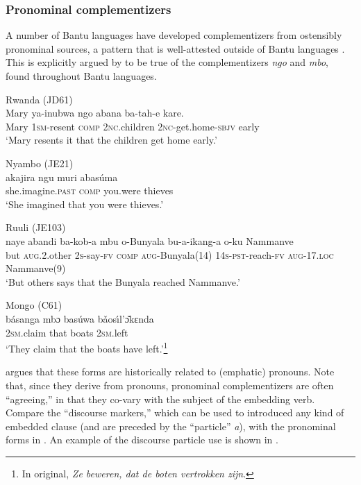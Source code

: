 \documentclass[output=paper,colorlinks,citecolor=brown,
]{langscibook}
\begin{document}
\subsubsection{Pronominal complementizers}\label{sec:gluckman:procompsection}


 A number of Bantu languages have developed complementizers from ostensibly pronominal sources, a pattern that is well-attested outside of Bantu languages  \citep{DiesselBreunesse:2020}. This is explicitly argued by \citet{Botne:1995} to be true of the complementizers \textit{ngo} and \textit{mbo}, found throughout Bantu languages. 

	\ea
		\begin{xlist}
		\ex Rwanda (JD61) \citep[38]{Rugege:1984} \\
		\gll Mary ya-inubwa ngo abana ba-tah-e kare.\\
		Mary 1\textsc{sm}-resent \textsc{comp} 2\textsc{nc}.children 2\textsc{nc}-get.home-\textsc{sbjv} early\\
		\glt `Mary resents it that the children get home early.' 

	\ex Nyambo (JE21) \citep[96]{Rugemalira:2005} \\
	\gll akajira ngu muri abas\'uma\\
	she.imagine.\textsc{past} \textsc{comp} you.were thieves\\
	\glt `She imagined that you were thieves.' 
	
	\ex Ruuli (JE103) \citep[94]{Sorensonetal:2020} \\
	\gll naye abandi ba-kob-a mbu o-Bunyala bu-a-ikang-a o-ku Nammanve\\
	but \textsc{aug}.2.other 2\textsc{s}-say-\textsc{fv} \textsc{comp} \textsc{aug}-Bunyala(14) 14\textsc{s}-\textsc{pst}-reach-\textsc{fv} \textsc{aug}-17.\textsc{loc} Nammanve(9)\\
	\glt `But others says that the Bunyala reached Nammanve.' 


	\ex Mongo (C61) \citep[126]{Rop:1958} \\
	\gll básanga mbɔ bas\'uwa b\v{a}os\'\i l'\v{ɔ}kɛnda\\
	2\textsc{sm}.claim that boats 2\textsc{sm.}left\\
	\glt `They claim that the boats have left.'\footnote{In original, \textit{Ze beweren, dat de boten vertrokken zijn}.} 
		\end{xlist}
	\z


\citet{Botne:1995} argues that these forms are historically related to (emphatic) pronouns. Note that, since they derive from pronouns, pronominal complementizers are often ``agreeing,'' in that they co-vary with the subject of the embedding verb. Compare the ``discourse markers,'' which can be used to introduced any kind of embedded clause (and are preceded by the ``particle'' \textit{a}), with the pronominal forms in . An example of the discourse particle use is shown in . 
\end{document}
